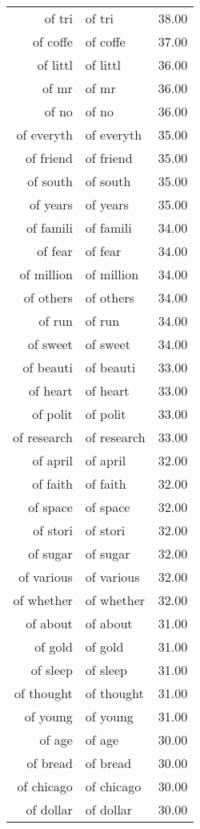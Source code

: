 \begin{table}[ht]
\begin{tabular}{rlr}
  of tri & of tri & 38.00 \\ 
  of coffe & of coffe & 37.00 \\ 
  of littl & of littl & 36.00 \\ 
  of mr & of mr & 36.00 \\ 
  of no & of no & 36.00 \\ 
  of everyth & of everyth & 35.00 \\ 
  of friend & of friend & 35.00 \\ 
  of south & of south & 35.00 \\ 
  of years & of years & 35.00 \\ 
  of famili & of famili & 34.00 \\ 
  of fear & of fear & 34.00 \\ 
  of million & of million & 34.00 \\ 
  of others & of others & 34.00 \\ 
  of run & of run & 34.00 \\ 
  of sweet & of sweet & 34.00 \\ 
  of beauti & of beauti & 33.00 \\ 
  of heart & of heart & 33.00 \\ 
  of polit & of polit & 33.00 \\ 
  of research & of research & 33.00 \\ 
  of april & of april & 32.00 \\ 
  of faith & of faith & 32.00 \\ 
  of space & of space & 32.00 \\ 
  of stori & of stori & 32.00 \\ 
  of sugar & of sugar & 32.00 \\ 
  of various & of various & 32.00 \\ 
  of whether & of whether & 32.00 \\ 
  of about & of about & 31.00 \\ 
  of gold & of gold & 31.00 \\ 
  of sleep & of sleep & 31.00 \\ 
  of thought & of thought & 31.00 \\ 
  of young & of young & 31.00 \\ 
  of age & of age & 30.00 \\ 
  of bread & of bread & 30.00 \\ 
  of chicago & of chicago & 30.00 \\ 
  of dollar & of dollar & 30.00 \\ 

\end{tabular}
\end{table}
